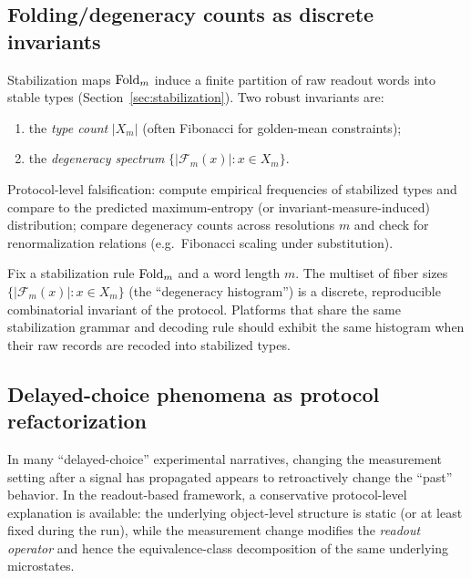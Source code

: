 \subsection{Folding/degeneracy counts as discrete invariants}\label{sec:falsifiability:folding}

Stabilization maps $\mathrm{Fold}_m$ induce a finite partition of raw readout words into stable types (Section~\ref{sec:stabilization}). Two robust invariants are:
\begin{enumerate}[label=(\roman*),leftmargin=*,itemsep=2pt]
  \item the \emph{type count} $|X_m|$ (often Fibonacci for golden-mean constraints);
  \item the \emph{degeneracy spectrum} $\{|\mathcal{F}_m(x)|: x\in X_m\}$.
\end{enumerate}
Protocol-level falsification: compute empirical frequencies of stabilized types and compare to the predicted maximum-entropy (or invariant-measure-induced) distribution; compare degeneracy counts across resolutions $m$ and check for renormalization relations (e.g.\ Fibonacci scaling under substitution).

\begin{proposition}\label{prop:P3}
Fix a stabilization rule $\mathrm{Fold}_m$ and a word length $m$. The multiset of fiber sizes $\{|\mathcal{F}_m(x)|:x\in X_m\}$ (the ``degeneracy histogram'') is a discrete, reproducible combinatorial invariant of the protocol. Platforms that share the same stabilization grammar and decoding rule should exhibit the same histogram when their raw records are recoded into stabilized types.
\end{proposition}

\subsection{Delayed-choice phenomena as protocol refactorization}\label{sec:falsifiability:delayed-choice}

In many ``delayed-choice'' experimental narratives, changing the measurement setting after a signal has propagated appears to retroactively change the ``past'' behavior. In the readout-based framework, a conservative protocol-level explanation is available: the underlying object-level structure is static (or at least fixed during the run), while the measurement change modifies the \emph{readout operator} and hence the equivalence-class decomposition of the same underlying microstates.

